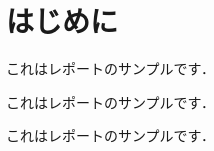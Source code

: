 \documentclass[titlepage]{jarticle}
\title{}
\author{平田 蓮}
\date{2019年月日}
\begin{document}
\maketitle

\section{はじめに}

これはレポートのサンプルです．

これはレポートのサンプルです．

これはレポートのサンプルです．
\end{document}
